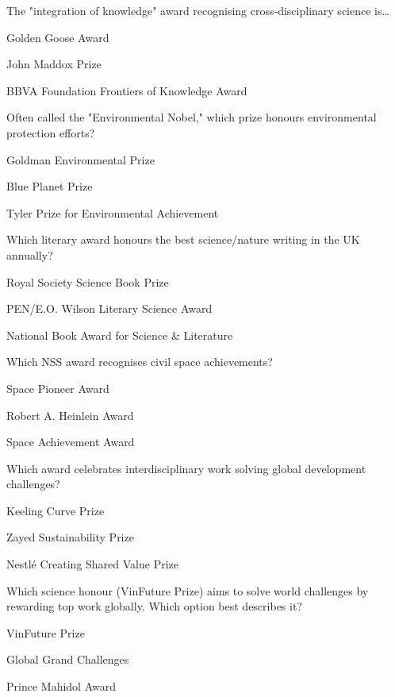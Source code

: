 \begin{enhancedmcq}{The "integration of knowledge" award recognising cross‑disciplinary science is…}
\item Golden Goose Award
\item John Maddox Prize
\item BBVA Foundation Frontiers of Knowledge Award

\end{enhancedmcq}
\begin{enhancedmcq}{Often called the "Environmental Nobel," which prize honours environmental protection efforts?}
\item Goldman Environmental Prize
\item Blue Planet Prize
\item Tyler Prize for Environmental Achievement

\end{enhancedmcq}
\begin{enhancedmcq}{Which literary award honours the best science/nature writing in the UK annually?}
\item Royal Society Science Book Prize
\item PEN/E.O. Wilson Literary Science Award
\item National Book Award for Science & Literature

\end{enhancedmcq}
\begin{enhancedmcq}{Which NSS award recognises civil space achievements?}
\item Space Pioneer Award
\item Robert A. Heinlein Award
\item Space Achievement Award

\end{enhancedmcq}
\begin{enhancedmcq}{Which award celebrates interdisciplinary work solving global development challenges?}
\item Keeling Curve Prize
\item Zayed Sustainability Prize
\item Nestlé Creating Shared Value Prize

\end{enhancedmcq}
\begin{enhancedmcq}{Which science honour (VinFuture Prize) aims to solve world challenges by rewarding top work globally. Which option best describes it?}
\item VinFuture Prize
\item Global Grand Challenges
\item Prince Mahidol Award

\end{enhancedmcq}
